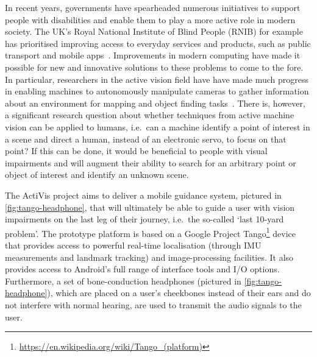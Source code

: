 \documentclass{llncs}
\begin{document}
In recent years, governments have spearheaded numerous initiatives to support people with disabilities and enable them to play a more active role in modern society.
The UK's Royal National Institute of Blind People (RNIB) for example has prioritised improving access to everyday services and products, such as public transport and mobile apps~\cite{rnib2016uk}.
Improvements in modern computing have made it possible for new and innovative solutions to these problems to come to the fore.
In particular, researchers in the active vision field have have made much progress in enabling machines to autonomously manipulate cameras to gather information about an environment for mapping and object finding tasks~\cite{bajcsy2018revisiting,lock2019active}.
There is, however, a significant research question about whether techniques from active machine vision can be applied to humans, i.e.\ can a machine identify a point of interest in a scene and direct a human, instead of an electronic servo, to focus on that point?
If this can be done, it would be beneficial to people with visual impairments and will augment their ability to search for an arbitrary point or object of interest and identify an unknown scene. 

The ActiVis project aims to deliver a mobile guidance system, pictured in \cref{fig:tango-headphone}, that will ultimately be able to guide a user with vision impairments on the last leg of their journey, i.e.\ the so-called `last 10-yard problem'. 
The prototype platform is based on a Google Project Tango\footnote{\url{https://en.wikipedia.org/wiki/Tango\_(platform)}} device that provides access to powerful real-time localisation (through IMU measurements and landmark tracking) and image-processing facilities. It also provides access to Android's full range of interface tools and I/O options. 
Furthermore, a set of bone-conduction headphones (pictured in \cref{fig:tango-headphone}), which are placed on a user's cheekbones instead of their ears and do not interfere with normal hearing, are used to transmit the audio signals to the user.
\end{document}
